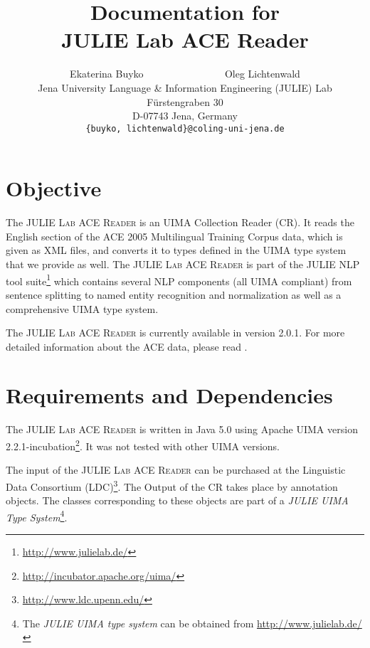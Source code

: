 \documentclass[11pt,a4paper,halfparskip]{scrartcl}
\title{\small{Documentation for}\\\huge JULIE Lab ACE Reader}
\author{\normalsize Ekaterina Buyko ~~~~~~~~~~~~~~~ Oleg Lichtenwald\\
  \normalsize  Jena University Language \& Information Engineering (JULIE) Lab\\
  \normalsize F\"urstengraben 30 \\
  \normalsize D-07743 Jena, Germany\\
  {\normalsize \tt \{buyko, lichtenwald\}@coling-uni-jena.de} }
\date{}
\begin{document}
\maketitle

\section{Objective}




The \textsc{JULIE Lab ACE Reader} is an UIMA Collection Reader (CR). It reads the English section of the ACE 2005 Multilingual Training
Corpus data, which is given as XML files, and converts it to types defined in the UIMA type system that we provide as well. 
The \textsc{JULIE Lab ACE Reader} is part of the JULIE NLP tool
suite\footnote{\url{http://www.julielab.de/}} which contains several NLP components 
(all UIMA compliant) from sentence splitting to named entity recognition and 
normalization as well as a comprehensive UIMA type system.

The \textsc{JULIE Lab ACE Reader} is currently available in version 2.0.1. For more detailed information about the ACE data, please read \cite{doddington04}.






\section{Requirements and Dependencies}



The \textsc{JULIE Lab ACE Reader} is written in Java 5.0 using Apache
UIMA version 2.2.1-incubation\footnote{\url{http://incubator.apache.org/uima/}}. It
was not tested with other UIMA versions.


The input of the \textsc{JULIE Lab ACE Reader} can be purchased at the Linguistic Data Consortium (LDC)\footnote{\url{http://www.ldc.upenn.edu/}}. The Output of the CR takes place by annotation objects. The 
classes corresponding to these objects are part of a \emph{JULIE UIMA
  Type System}\footnote{The \emph{JULIE UIMA type system} can be
  obtained from \url{http://www.julielab.de/}}.
\end{document}
